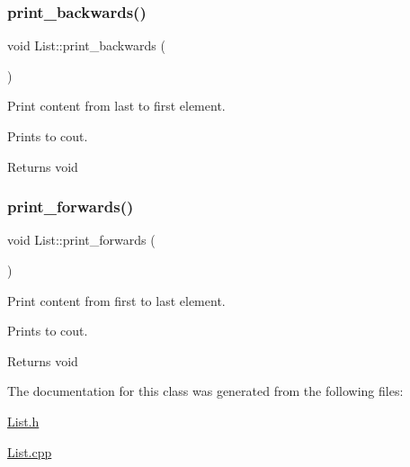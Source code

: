 \subsubsection{\texorpdfstring{print\+\_\+backwards()}{print\_backwards()}}
{\footnotesize\ttfamily void List\+::print\+\_\+backwards (\begin{DoxyParamCaption}{ }\end{DoxyParamCaption})}



Print content from last to first element. 

Prints to cout.

\begin{DoxyReturn}{Returns}
void 
\end{DoxyReturn}
\mbox{\label{class_list_a9cd9aa3b710f2c17acbc41a9c376f337}} 
\subsubsection{\texorpdfstring{print\+\_\+forwards()}{print\_forwards()}}
{\footnotesize\ttfamily void List\+::print\+\_\+forwards (\begin{DoxyParamCaption}{ }\end{DoxyParamCaption})}



Print content from first to last element. 

Prints to cout.

\begin{DoxyReturn}{Returns}
void 
\end{DoxyReturn}


The documentation for this class was generated from the following files\+:\begin{DoxyCompactItemize}
\item 
\hyperlink{_list_8h}{List.\+h}\item 
\hyperlink{_list_8cpp}{List.\+cpp}\end{DoxyCompactItemize}

